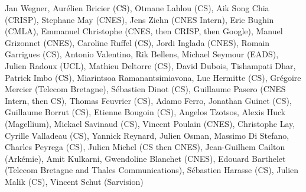 Jan Wegner, Aur\'elien Bricier (CS), Otmane Lahlou (CS), Aik Song Chia (CRISP), Stephane May (CNES), Jens Ziehn (CNES Intern), Eric Bughin (CMLA), Emmanuel Christophe (CNES, then CRISP, then Google), Manuel Grizonnet (CNES), Caroline Ruffel (CS), Jordi Inglada (CNES), Romain Garrigues (CS), Antonio Valentino, Rik Bellens, Michael Seymour (EADS), Julien Radoux (UCL), Mathieu Deltorre (CS), David Dubois, Tishampati Dhar, Patrick Imbo (CS), Miarintsoa Ramanantsimiavona, Luc Hermitte (CS), Gr\'egoire Mercier (Telecom Bretagne), S\'ebastien Dinot (CS), Guillaume Pasero (CNES Intern, then CS), Thomas Feuvrier (CS), Adamo Ferro, Jonathan Guinet (CS), Guillaume Borrut (CS), Etienne Bougoin (CS), Angelos Tzotsos, Alexis Huck (Magellium), Mickael Savinaud (CS), Vincent Poulain (CNES), Christophe Lay, Cyrille Valladeau (CS), Yannick Reynard, Julien Osman, Massimo Di Stefano, Charles Peyrega (CS), Julien Michel (CS then CNES), Jean-Guilhem Cailton (Ark\'emie), Amit Kulkarni, Gwendoline Blanchet (CNES), Edouard Barthelet (Telecom Bretagne and Thales Communications), S\'ebastien Harasse (CS), Julien Malik (CS), Vincent Schut (Sarvision)